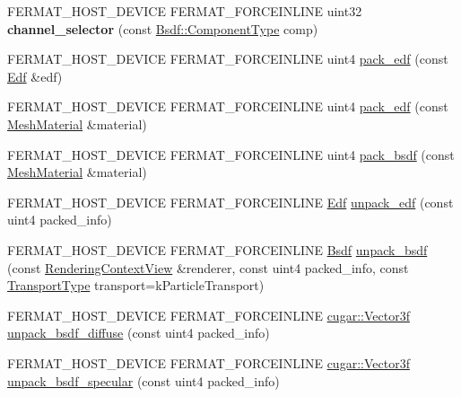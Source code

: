 \begin{DoxyCompactItemize}
\mbox{\label{group___b_p_t_lib_core_ga6dccad51efe9f04afa22146e529150a8}} 
F\+E\+R\+M\+A\+T\+\_\+\+H\+O\+S\+T\+\_\+\+D\+E\+V\+I\+CE F\+E\+R\+M\+A\+T\+\_\+\+F\+O\+R\+C\+E\+I\+N\+L\+I\+NE uint32 {\bfseries channel\+\_\+selector} (const \hyperlink{struct_bsdf_a5f7db6f81220ed9ee6da109d6eb5b585}{Bsdf\+::\+Component\+Type} comp)
\item 
F\+E\+R\+M\+A\+T\+\_\+\+H\+O\+S\+T\+\_\+\+D\+E\+V\+I\+CE F\+E\+R\+M\+A\+T\+\_\+\+F\+O\+R\+C\+E\+I\+N\+L\+I\+NE uint4 \hyperlink{group___b_p_t_lib_core_ga8d573ce2770a2613a1605ddc09154ffc}{pack\+\_\+edf} (const \hyperlink{struct_edf}{Edf} \&edf)
\item 
F\+E\+R\+M\+A\+T\+\_\+\+H\+O\+S\+T\+\_\+\+D\+E\+V\+I\+CE F\+E\+R\+M\+A\+T\+\_\+\+F\+O\+R\+C\+E\+I\+N\+L\+I\+NE uint4 \hyperlink{group___b_p_t_lib_core_gad4aa7704b646405fd0a0465ac8408e9d}{pack\+\_\+edf} (const \hyperlink{struct_mesh_material}{Mesh\+Material} \&material)
\item 
F\+E\+R\+M\+A\+T\+\_\+\+H\+O\+S\+T\+\_\+\+D\+E\+V\+I\+CE F\+E\+R\+M\+A\+T\+\_\+\+F\+O\+R\+C\+E\+I\+N\+L\+I\+NE uint4 \hyperlink{group___b_p_t_lib_core_gafc4b6904df544dc81fd8ced4434a6213}{pack\+\_\+bsdf} (const \hyperlink{struct_mesh_material}{Mesh\+Material} \&material)
\item 
F\+E\+R\+M\+A\+T\+\_\+\+H\+O\+S\+T\+\_\+\+D\+E\+V\+I\+CE F\+E\+R\+M\+A\+T\+\_\+\+F\+O\+R\+C\+E\+I\+N\+L\+I\+NE \hyperlink{struct_edf}{Edf} \hyperlink{group___b_p_t_lib_core_ga1d22946cfb852e33bf79b6e145eb10f9}{unpack\+\_\+edf} (const uint4 packed\+\_\+info)
\item 
F\+E\+R\+M\+A\+T\+\_\+\+H\+O\+S\+T\+\_\+\+D\+E\+V\+I\+CE F\+E\+R\+M\+A\+T\+\_\+\+F\+O\+R\+C\+E\+I\+N\+L\+I\+NE \hyperlink{struct_bsdf}{Bsdf} \hyperlink{group___b_p_t_lib_core_gaf814976a256cbbcf1e03fc5105688385}{unpack\+\_\+bsdf} (const \hyperlink{struct_rendering_context_view}{Rendering\+Context\+View} \&renderer, const uint4 packed\+\_\+info, const \hyperlink{group___b_s_d_f_module_gaca1e72535e7f260e54ed8bbf984dade9}{Transport\+Type} transport=k\+Particle\+Transport)
\item 
F\+E\+R\+M\+A\+T\+\_\+\+H\+O\+S\+T\+\_\+\+D\+E\+V\+I\+CE F\+E\+R\+M\+A\+T\+\_\+\+F\+O\+R\+C\+E\+I\+N\+L\+I\+NE \hyperlink{structcugar_1_1_vector}{cugar\+::\+Vector3f} \hyperlink{group___b_p_t_lib_core_ga83f7d21077ca755f72b6e699f29f4704}{unpack\+\_\+bsdf\+\_\+diffuse} (const uint4 packed\+\_\+info)
\item 
F\+E\+R\+M\+A\+T\+\_\+\+H\+O\+S\+T\+\_\+\+D\+E\+V\+I\+CE F\+E\+R\+M\+A\+T\+\_\+\+F\+O\+R\+C\+E\+I\+N\+L\+I\+NE \hyperlink{structcugar_1_1_vector}{cugar\+::\+Vector3f} \hyperlink{group___b_p_t_lib_core_gae8ae96255cfc4529971fc00aa44ac9ab}{unpack\+\_\+bsdf\+\_\+specular} (const uint4 packed\+\_\+info)

\end{DoxyCompactItemize}
